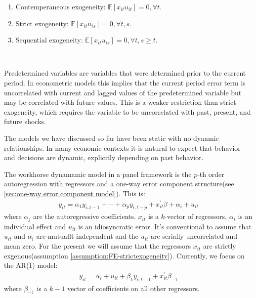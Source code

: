 \begin{enumerate}
    \item Contemperaneous exogeneity: $\mathbb{E}[x_{it} u_{it}] = 0, \forall t.$
    \item Strict exogeneity: $\mathbb{E}[x_{it} u_{is}] = 0, \forall t, s.$
    \item Sequential exogeneity: $\mathbb{E}[x_{it} u_{is}] = 0, \forall t, s \geq t.$
\end{enumerate}
\begin{definition}
    \

    Predetermined variables are variables that were determined prior to the current period. 
    In econometric models this implies that the current period error term is 
    uncorrelated with current and lagged values of the predetermined variable 
    but may be correlated with future values. 
    This is a weaker restriction than strict exogeneity, 
    which requires the variable to be uncorrelated with past, present, and future shocks.
\end{definition}

The models we have discussed so far have been static with no dynamic relationships.
In many economic contexts it is natural to expect that behavior and decisions are dynamic, explicitly depending
on past behavior. 

The workhorse dynamamic model in a panel framework is the $p$-th order autoregression with regressors
and a one-way error component structure(see \ref{sec:one-way error component model}).
This is:
\begin{gather}\label{eq:FE-IV base}
    y_{it} = \alpha_1 y_{i,t-1} + \cdots + \alpha_p y_{i,t-p} + x_{it}^{\prime} \beta + \alpha_i + u_{it} 
\end{gather}
where $\alpha_j$ are the autoregressive coefficients. $x_{it}$ is a $k$-vector of regressors,
$\alpha_i$ is an individual effect and $u_{it}$ is an idiosyncratic error.
It's conventional to assume that $u_{it}$ and $\alpha_i$ are mutuallt independent and
the $u_{it}$ are serially uncorrelated and mean zero.
For the present we will assume that the regressors $x_{it}$ are strictly exgenous(assumption \ref{assumption:FE-strictexogeneity}).
Currently, we focus on the AR(1) model:
\begin{gather*}
    y_{it} = \alpha_i + u_{it} + \beta_1 y_{i,t-1} + x_{it}^{\prime} \beta_{-1}
\end{gather*}
where $\beta_{-1}$ is a $k-1$ vector of coefficients on all other regressors.

